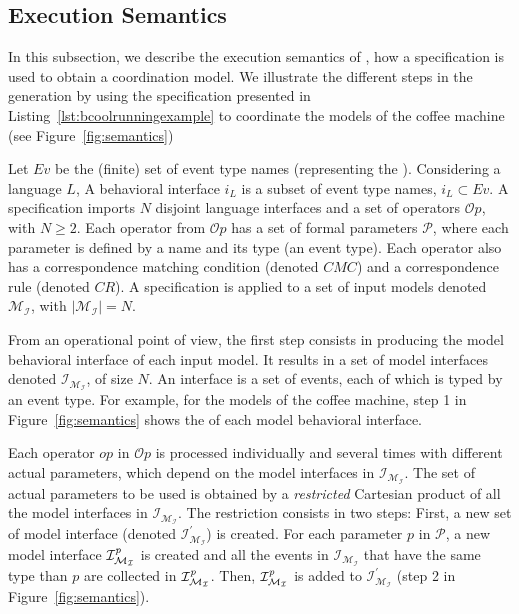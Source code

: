 \subsection{Execution Semantics}
In this subsection, we describe the execution semantics of \bcool, \ie how a \bcool specification is used to obtain a coordination model. We illustrate the different steps in the generation by using the specification presented in Listing~\ref{lst:bcoolrunningexample} to coordinate the models of the coffee machine (see Figure~\ref{fig:semantics})

Let $Ev$ be the (finite) set of event type names (representing the \dse). Considering a language $L$, A behavioral interface $i_L$ is a subset of event type names, $i_L \subset Ev$. A \bcool specification imports $N$ disjoint language interfaces and a set of operators $\mathcal{O}p$, with $N\geq 2$. Each operator from $\mathcal{O}p$ has a set of formal parameters $\mathcal{P}$, where each parameter is defined by a name and its type (\ie an event type). Each operator also has a correspondence matching condition (denoted $CMC$) and a correspondence rule (denoted $CR$). A \bcool specification is applied to a set of input models denoted $\mathcal{M_I}$, with $|\mathcal{M_I}| = N$.

From an operational point of view, the first step consists in producing the model behavioral interface of each input model. It results in a set of model interfaces denoted $\mathcal{I_{M_I}}$, of size $N$. An interface is a set of events, each of which is typed by an event type. For example, for the models of the coffee machine, step 1 in Figure~\ref{fig:semantics} shows the \mse of each model behavioral interface.  

Each operator $op$ in $\mathcal{O}p$ is processed individually and several times with different actual parameters, which depend on the model interfaces in $\mathcal{I_{M_I}}$. The set of actual parameters to be used is obtained by a \emph{restricted} Cartesian product of all the model interfaces in $\mathcal{I_{M_I}}$. The restriction consists in two steps: First, a new set of model interface (denoted $\mathcal{I^{'}_{M_I}}$) is created. For each parameter $p$ in $\mathcal{P}$, a new model interface $\mathcal{I^{\textit{\text{p}}}_{M_I}}$ is created and all the events in $\mathcal{I_{M_I}}$ that have the same type than $p$ are collected in $\mathcal{I^{\textit{\text{p}}}_{M_I}}$. Then, $\mathcal{I^{\textit{\text{p}}}_{M_I}}$ is added to $\mathcal{I^{'}_{M_I}}$ (step 2 in Figure~\ref{fig:semantics}). 
%


